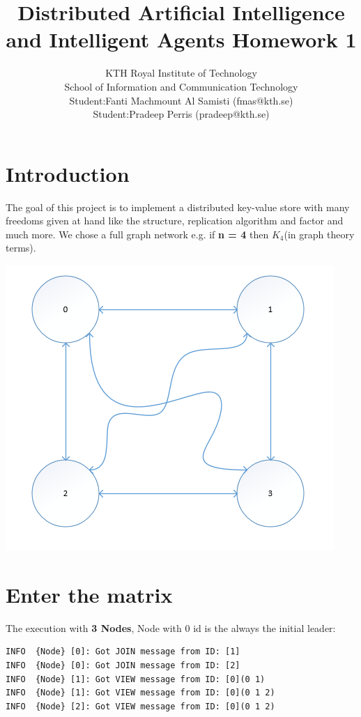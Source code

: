 \documentclass[a4paper, 11pt]{article}
\title{\textbf{Distributed Artificial Intelligence and Intelligent Agents Homework 1}}
\author{KTH Royal Institute of Technology \\ 
		School of Information and Communication Technology \\
		Student:Fanti Machmount Al Samisti (fmas@kth.se) \\
		Student:Pradeep Perris (pradeep@kth.se)}
\begin{document}
	
\maketitle

\section{Introduction}

\noindent The goal of this project is to implement a distributed key-value store with many freedoms given at hand like the structure, replication algorithm and factor and much more. We chose a full graph network e.g. if \textbf{n = 4} then $K_4$(in graph theory terms). 

{\centering\includegraphics[scale = 0.9]{./figures/network-overview.png}\par}

\section{Enter the matrix}

\noindent The execution with \textbf{3 Nodes}, Node with 0 id is the always the initial leader:
\begin{verbatim}
INFO  {Node} [0]: Got JOIN message from ID: [1]
INFO  {Node} [0]: Got JOIN message from ID: [2]
INFO  {Node} [1]: Got VIEW message from ID: [0](0 1)
INFO  {Node} [1]: Got VIEW message from ID: [0](0 1 2)
INFO  {Node} [2]: Got VIEW message from ID: [0](0 1 2)
\end{verbatim}
\end{document}
